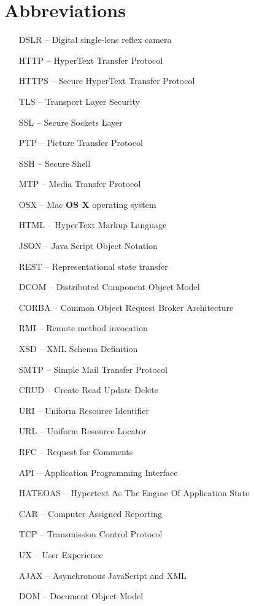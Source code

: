 \section*{Abbreviations}

\begin{itemize}[leftmargin=2cm, topsep=0pt, partopsep=5pt,itemsep=0pt,parsep=0pt]
\item[DSLR --] Digital single-lens reflex camera
\item[HTTP --] HyperText Transfer Protocol
\item[HTTPS --] Secure HyperText Transfer Protocol
\item[TLS --] Transport Layer Security
\item[SSL --] Secure Sockets Layer
\item[PTP --] Picture Transfer Protocol
\item[SSH --] Secure Shell
\item[MTP --] Media Transfer Protocol
\item[OSX --] Mac \textbf{OS X} operating system
\item[HTML --] HyperText Markup Language
\item[JSON --] Java Script Object Notation
\item[REST --] Representational state transfer
\item[DCOM --] Distributed Component Object Model
\item[CORBA --] Common Object Request Broker Architecture
\item[RMI --] Remote method invocation
\item[XSD --] XML Schema Definition
\item[SMTP --] Simple Mail Transfer Protocol
\item[CRUD --] Create Read Update Delete
\item[URI --] Uniform Resource Identifier
\item[URL --] Uniform Resource Locator
\item[RFC --] Request for Comments
\item[API --] Application Programming Interface
\item[HATEOAS --] Hypertext As The Engine Of Application State
\item[CAR --] Computer Assigned Reporting
\item[TCP --] Transmission Control Protocol
\item[UX --] User Experience
\item[AJAX --] Asynchronous JavaScript and XML
\item[DOM --] Document Object Model

\end{itemize}
